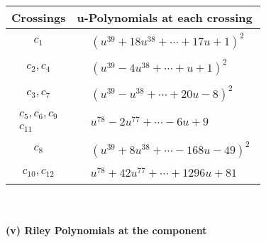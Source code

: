 \documentclass[1p]{elsarticle_modified}
\theoremstyle{definition}
\begin{document}
\begin{tabular}{m{50pt}|m{274pt}}
Crossings & \hspace{64pt}u-Polynomials at each crossing \\
\hline $$\begin{aligned}c_{1}\end{aligned}$$&$\begin{aligned}
&(u^{39}+18 u^{38}+\cdots+17 u+1)^{2}
\end{aligned}$\\
\hline $$\begin{aligned}c_{2},c_{4}\end{aligned}$$&$\begin{aligned}
&(u^{39}-4 u^{38}+\cdots+u+1)^{2}
\end{aligned}$\\
\hline $$\begin{aligned}c_{3},c_{7}\end{aligned}$$&$\begin{aligned}
&(u^{39}- u^{38}+\cdots+20 u-8)^{2}
\end{aligned}$\\
\hline $$\begin{aligned}c_{5},c_{6},c_{9}\\c_{11}\end{aligned}$$&$\begin{aligned}
&u^{78}-2 u^{77}+\cdots-6 u+9
\end{aligned}$\\
\hline $$\begin{aligned}c_{8}\end{aligned}$$&$\begin{aligned}
&(u^{39}+8 u^{38}+\cdots-168 u-49)^{2}
\end{aligned}$\\
\hline $$\begin{aligned}c_{10},c_{12}\end{aligned}$$&$\begin{aligned}
&u^{78}+42 u^{77}+\cdots+1296 u+81
\end{aligned}$\\
\hline
\end{tabular}\\~\\
\newpage\renewcommand{\arraystretch}{1}
\flushleft \textbf{(v) Riley Polynomials at the component}\newline \\
\end{document}
